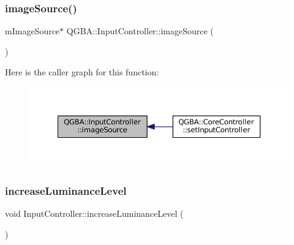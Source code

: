 \subsubsection{\texorpdfstring{image\+Source()}{imageSource()}}
{\footnotesize\ttfamily m\+Image\+Source$\ast$ Q\+G\+B\+A\+::\+Input\+Controller\+::image\+Source (\begin{DoxyParamCaption}{ }\end{DoxyParamCaption})\hspace{0.3cm}{\ttfamily [inline]}}

Here is the caller graph for this function\+:
\nopagebreak
\begin{figure}[H]
\begin{center}
\leavevmode
\includegraphics[width=350pt]{class_q_g_b_a_1_1_input_controller_a6147d43ba78ebdce790666ab74922ba3_icgraph}
\end{center}
\end{figure}
\mbox{\label{class_q_g_b_a_1_1_input_controller_a0d9d6daa47b8b5d18f22d250d253e228}} 
\subsubsection{\texorpdfstring{increase\+Luminance\+Level}{increaseLuminanceLevel}}
{\footnotesize\ttfamily void Input\+Controller\+::increase\+Luminance\+Level (\begin{DoxyParamCaption}{ }\end{DoxyParamCaption})\hspace{0.3cm}{\ttfamily [slot]}}

